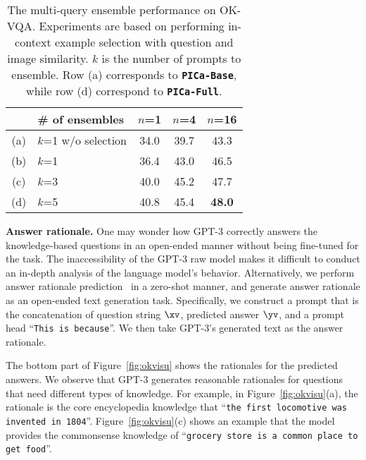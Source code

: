 \begin{table}[t]
\small \centering
\centering
\begin{tabular}{ c l || c c c }
    \hline
    & \# of ensembles & $n$=1 & $n$=4 & $n$=16\\
    \hline
    (a) & $k$=1 w/o selection & 34.0 & 39.7 & 43.3  \\
    (b) & $k$=1 & 36.4 & 43.0 & 46.5  \\
    (c) & $k$=3 & 40.0 & 45.2 & 47.7  \\
    (d) & $k$=5 & 40.8 & 45.4 & \textbf{48.0}  \\
    \hline\end{tabular}
\vspace{-2mm}
\caption{\small The multi-query ensemble performance on OK-VQA. Experiments are based on performing in-context example selection with question and image similarity. $k$ is the number of prompts to ensemble. Row (a) corresponds to \textbf{\texttt{PICa-Base}}, while row (d) correspond to \textbf{\texttt{PICa-Full}}.}
\label{table:ensemble}
\vspace{-3mm}
\end{table}

\vspace{2mm}
\noindent\textbf{Answer rationale.}
One may wonder how GPT-3 correctly answers the knowledge-based questions in an open-ended manner without being fine-tuned for the task. The inaccessibility of the GPT-3 raw model makes it difficult to conduct an in-depth analysis of the language model's behavior. Alternatively, we perform answer rationale prediction~\cite{li2018vqa,park2018multimodal,zellers2019recognition} in a zero-shot manner, and generate answer rationale as an open-ended text generation task. Specifically, we construct a prompt that is the concatenation of question string $\xv$, predicted answer $\yv$, and a prompt head ``\texttt{This is because}''. We then take GPT-3's generated text as the answer rationale.

The bottom part of Figure~\ref{fig:okvisu} shows the rationales for the predicted answers. We observe that GPT-3 generates reasonable rationales for questions that need different types of knowledge. For example, in Figure~\ref{fig:okvisu}(a), the rationale is the core encyclopedia knowledge that ``\texttt{the first locomotive was invented in 1804}''. Figure~\ref{fig:okvisu}(c) shows an example that the model provides the commonsense knowledge of ``\texttt{grocery store is a common place to get food}''.



